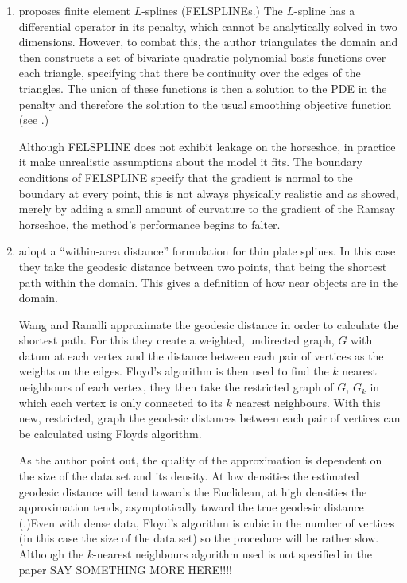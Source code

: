 \begin{enumerate}
\item \cite{ramsay} proposes finite element $L$-splines (FELSPLINEs.) The $L$-spline has a differential operator in its penalty, which cannot be analytically solved in two dimensions. However, to combat this, the author triangulates the domain and then constructs a set of bivariate quadratic polynomial basis functions over each triangle, specifying that there be continuity over the edges of the triangles. The union of these functions is then a solution to the PDE in the penalty and therefore the solution to the usual smoothing objective function (see .)

Although FELSPLINE does not exhibit leakage on the horseshoe, in practice it make unrealistic assumptions about the model it fits. The boundary conditions of FELSPLINE specify that the gradient is normal to the boundary at every point, this is not always physically realistic and as \cite{soap} showed, merely by adding a small amount of curvature to the gradient of the Ramsay horseshoe, the method's performance begins to falter.

\item \cite{wangranalli} adopt a ``within-area distance'' formulation for thin plate splines. In this case they take the geodesic distance between two points, that being the shortest path within the domain. This gives a definition of how near objects are in the domain.

Wang and Ranalli approximate the geodesic distance in order to calculate the shortest path. For this they create a weighted, undirected graph, $G$ with datum at each vertex and the distance between each pair of vertices as the weights on the edges. Floyd's algorithm is then used to find the $k$ nearest neighbours of each vertex, they then take the restricted graph of $G$, $G_k$ in which each vertex is only connected to its $k$ nearest neighbours. With this new, restricted, graph the geodesic distances between each pair of vertices can be calculated using Floyds algorithm.

As the author point out, the quality of the approximation is dependent on the size of the data set and its density. At low densities the estimated geodesic distance will tend towards the Euclidean, at high densities the approximation tends, asymptotically toward the true geodesic distance (\cite{bernstein}.)Even with dense data, Floyd's algorithm is cubic in the number of vertices (in this case the size of the data set) so the procedure will be rather slow. Although the $k$-nearest neighbours algorithm used is not specified in the paper SAY SOMETHING MORE HERE!!!!


\end{enumerate}
